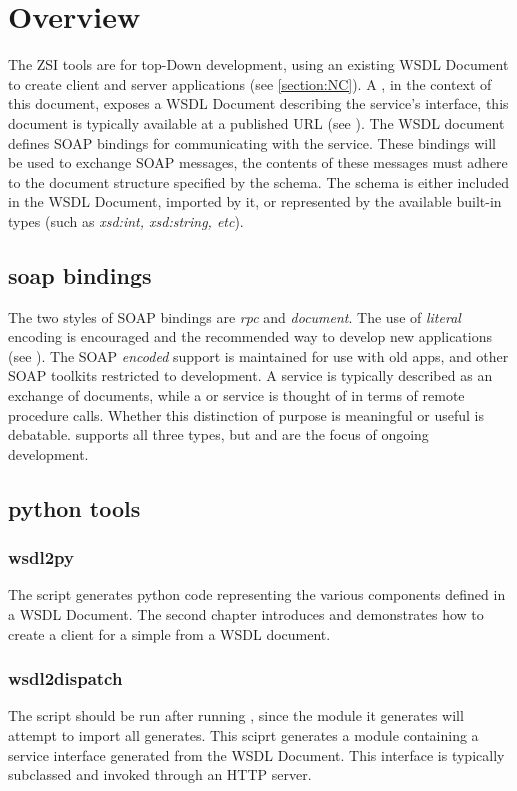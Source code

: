\section{Overview}
The ZSI \WS{} tools are for top-Down \WS{} development, using an existing WSDL
Document to create client and server applications (see \ref{section:NC}). A \WS{}, in the context of this document, exposes a WSDL Document describing the
service's interface, this document is typically available at a published URL (see
\URL).  The WSDL document defines SOAP bindings for communicating with the 
service. These bindings will be used to exchange SOAP messages, the contents of
these messages must adhere to the document structure specified by the schema. The 
schema is either included in the WSDL Document, imported by it, or represented
by the available built-in types (such as \emph{xsd:int, xsd:string, etc}).  

\subsection{soap bindings}
The two styles of SOAP bindings are \emph{rpc} and \emph{document}.  The use of
\emph{literal} encoding is encouraged and the recommended way to develop new \WS{}
applications (see \WSI{}).  The SOAP \emph{encoded} support is maintained for use
with old apps, and other SOAP toolkits restricted to \RPCENC{} development.
A \DOCLIT{} service is typically described as an exchange of documents, while a
\RPCENC{} or \RPCLIT{} service is thought of in terms of remote procedure calls.
Whether this distinction of purpose is meaningful or useful is debatable.  \ZSI{}
supports all three types, but \RPCLIT{} and \DOCLIT{} are the focus of ongoing 
development.

\subsection{python tools}
\subsubsection{wsdl2py}
The \WPY{} script generates python code representing the various components
defined in a WSDL Document.  The second chapter introduces \WPY{} and demonstrates
how to create a client for a simple \WS{} from a WSDL document.
\subsubsection{wsdl2dispatch}
The \WPYDIS{} script should be run after running \WPY{}, since the module it generates 
will attempt to import all \WPY{} generates.  This sciprt generates a module containing a service
interface generated  from the WSDL Document. This interface is typically
subclassed and invoked through an HTTP server. 


